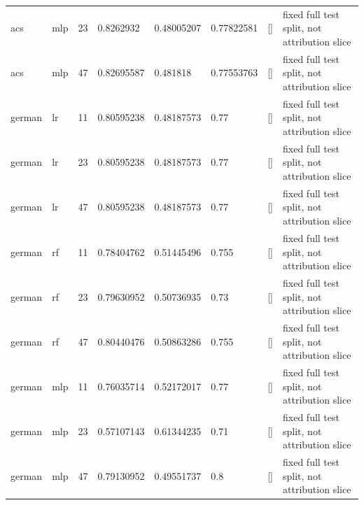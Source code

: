 \begin{tabular}{llllllll}
acs & mlp & 23 & 0.8262932 & 0.48005207 & 0.77822581 & [] & fixed full test split, not attribution slice \\
acs & mlp & 47 & 0.82695587 & 0.481818 & 0.77553763 & [] & fixed full test split, not attribution slice \\
german & lr & 11 & 0.80595238 & 0.48187573 & 0.77 & [] & fixed full test split, not attribution slice \\
german & lr & 23 & 0.80595238 & 0.48187573 & 0.77 & [] & fixed full test split, not attribution slice \\
german & lr & 47 & 0.80595238 & 0.48187573 & 0.77 & [] & fixed full test split, not attribution slice \\
german & rf & 11 & 0.78404762 & 0.51445496 & 0.755 & [] & fixed full test split, not attribution slice \\
german & rf & 23 & 0.79630952 & 0.50736935 & 0.73 & [] & fixed full test split, not attribution slice \\
german & rf & 47 & 0.80440476 & 0.50863286 & 0.755 & [] & fixed full test split, not attribution slice \\
german & mlp & 11 & 0.76035714 & 0.52172017 & 0.77 & [] & fixed full test split, not attribution slice \\
german & mlp & 23 & 0.57107143 & 0.61344235 & 0.71 & [] & fixed full test split, not attribution slice \\
german & mlp & 47 & 0.79130952 & 0.49551737 & 0.8 & [] & fixed full test split, not attribution slice \\
\bottomrule
\end{tabular}
